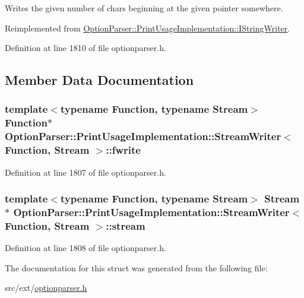 Writes the given number of chars beginning at the given pointer somewhere. 



Reimplemented from \hyperlink{struct_option_parser_1_1_print_usage_implementation_1_1_i_string_writer_acae5e8911028920188394436f9712251}{Option\-Parser\-::\-Print\-Usage\-Implementation\-::\-I\-String\-Writer}.



Definition at line 1810 of file optionparser.\-h.



\subsection{Member Data Documentation}
\hypertarget{struct_option_parser_1_1_print_usage_implementation_1_1_stream_writer_a6627a94257a890ec2786d542207dcf81}{
\subsubsection[{fwrite}]{\setlength{\rightskip}{0pt plus 5cm}template$<$typename Function, typename Stream$>$ Function$\ast$ {\bf Option\-Parser\-::\-Print\-Usage\-Implementation\-::\-Stream\-Writer}$<$ Function, Stream $>$\-::fwrite}}\label{struct_option_parser_1_1_print_usage_implementation_1_1_stream_writer_a6627a94257a890ec2786d542207dcf81}


Definition at line 1807 of file optionparser.\-h.

\hypertarget{struct_option_parser_1_1_print_usage_implementation_1_1_stream_writer_aa5271816c5a983d1094d95f4efb24bc6}{
\subsubsection[{stream}]{\setlength{\rightskip}{0pt plus 5cm}template$<$typename Function, typename Stream$>$ Stream$\ast$ {\bf Option\-Parser\-::\-Print\-Usage\-Implementation\-::\-Stream\-Writer}$<$ Function, Stream $>$\-::stream}}\label{struct_option_parser_1_1_print_usage_implementation_1_1_stream_writer_aa5271816c5a983d1094d95f4efb24bc6}


Definition at line 1808 of file optionparser.\-h.



The documentation for this struct was generated from the following file\-:\begin{DoxyCompactItemize}
\item 
src/ext/\hyperlink{optionparser_8h}{optionparser.\-h}\end{DoxyCompactItemize}
